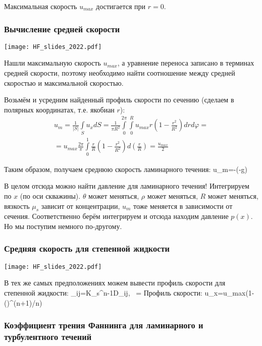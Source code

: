 \documentclass[main.tex]{subfiles}
\begin{document}
Максимальная скорость $u_{max}$ достигается при $r=0$.

\subsubsection{Вычисление средней скорости}

\texttt{[image: HF\_slides\_2022.pdf]}

Нашли максимальную скорость $u_{max}$, а уравнение переноса записано в терминах средней скорости, поэтому необходимо найти соотношение между средней скоростью и максимальной скоростью.

Возьмём и усредним найденный профиль скорости по сечению (сделаем в полярных координатах, т.е. якобиан $r$):
\begin{multline}
u_m=\frac{1}{|S|}\int\limits_S{u_xdS}=\frac{1}{\pi R^2}\int\limits_{0}^{2\pi}\int\limits_{0}^{R}u_{max}r\left(1-\frac{r^2}{R^2}\right)drd\varphi=\\=u_{max}\frac{2\pi}{\pi}\int\limits_0^1\frac{r}{R}\left(1-\frac{r^2}{R^2}\right)d\left(\frac{r}{R}\right)=\frac{u_{max}}{2}
\end{multline}

Таким образом, получаем среднюю скорость ламинарного течения:
\beq
u_m=-\left(-\rho g\sin{\theta}\right)
\eeq

В целом отсюда можно найти давление для ламинарного течения!
Интегрируем по $x$ (по оси скважины).
$\theta$ может меняться, $\rho$ может меняться, $R$ может меняться, вязкость $\mu_s$ зависит от концентрации, $u_m$ тоже меняется в зависимости от сечения.
Соответственно берём интегрируем и отсюда находим давление $p(x)$.
Но мы поступим немного по-другому.

\subsubsection{Средняя скорость для степенной жидкости}

\texttt{[image: HF\_slides\_2022.pdf]}

В тех же самых предположениях можем вывести профиль скорости для степенной жидкости:
\beq
\tau_{ij}=K_s\dot{\gamma}^{n-1}D_{ij},\,\,\,\,\,\dot{\gamma}=
\eeq
Профиль скорости:
\beq
u_x=u_{max}\left(1-\left(\right)^{(n+1)/n}\right)
\eeq
\ \\

\subsubsection{Коэффициент трения Фаннинга для ламинарного и турбулентного течений}
\end{document}
